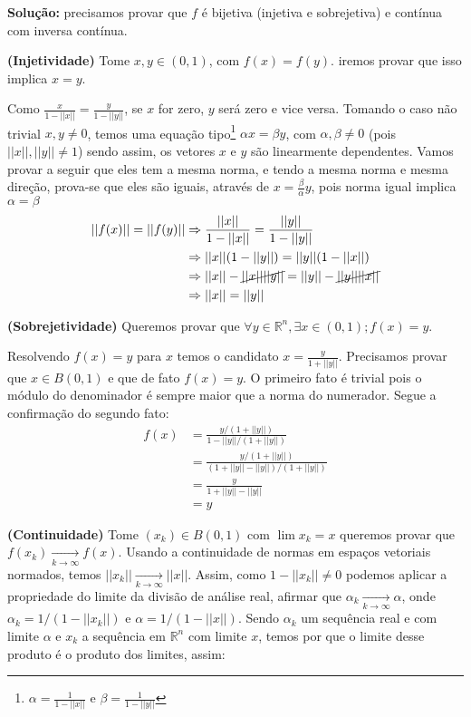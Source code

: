 \documentclass[12pt]{article}
\newcommand{\rn}{\mathbb{R}^n}
\begin{document}
\begin{enumerate}
\textbf{Solução:} precisamos provar que $f$ é bijetiva (injetiva e sobrejetiva) e contínua com inversa contínua.

\textbf{(Injetividade)} Tome $x,y\in(0,1)$, com $f(x)=f(y)$. iremos provar que isso implica $x=y$.

Como $\frac{x}{1 - ||x||}=\frac{y}{1 - ||y||}$, se $x$ for zero, $y$ será zero e vice versa. Tomando o caso não trivial $x,y\neq0$, temos uma equação tipo\footnote{$\alpha=\frac{1}{1 - ||x||}$ e $\beta=\frac{1}{1 - ||y||}$} $\alpha x=\beta y$, com $\alpha,\beta\neq0$ (pois $||x||,||y||\neq1$) sendo assim, os vetores $x$ e $y$ são linearmente dependentes. Vamos provar a seguir que eles tem a mesma norma, e tendo a mesma norma e mesma direção, prova-se que eles são iguais, através de $x=\frac\beta\alpha y$, pois norma igual implica $\alpha=\beta$
\begin{align}
	||f(x)||=||f(y)||&\Rightarrow \frac{||x||}{1 - ||x||}=\frac{||y||}{1 - ||y||}\nonumber\\
	&\Rightarrow ||x||(1-||y||)=||y||(1-||x||)\nonumber\\
	&\Rightarrow ||x||-\cancel{||x||||y||}=||y||-\cancel{||y||||x||}\nonumber\\
	&\Rightarrow ||x||=||y||\nonumber
\end{align}

\textbf{(Sobrejetividade)} Queremos provar que $\forall y \in \rn,\exists x\in(0,1);f(x)=y$.

Resolvendo $f(x)=y$ para $x$ temos o candidato $x=\frac{y}{1+||y||}$. Precisamos provar que $x\in B(0,1)$ e que de fato $f(x)=y$. O primeiro fato é trivial pois o módulo do denominador é sempre maior que a norma do numerador. Segue a confirmação do segundo fato:
\begin{align*}
	f(x)&=\frac{y/(1+||y||)}{1-||y||/(1+||y||)}\\
	&=\frac{y/(1+||y||)}{(1+||y||-||y||)/(1+||y||)}\\
	&=\frac{y}{1+||y||-||y||}\\
	&=y
\end{align*}

\textbf{(Continuidade)} Tome $(x_k)\in B(0,1)$ com $\lim x_k=x$ queremos provar que $f(x_k)\xrightarrow[k\to\infty]{}f(x)$. Usando a continuidade de normas em espaços vetoriais normados, temos $||x_k||\xrightarrow[k\to\infty]{}||x||$. Assim, como $1-||x_k||\neq0$ podemos aplicar a propriedade do limite da divisão de análise real\cite{lima1981curso}, afirmar que $\alpha_k\xrightarrow[k\to\infty]{}\alpha$, onde $\alpha_k=1/(1-||x_k||)$ e $\alpha=1/(1-||x||)$.
Sendo $\alpha_k$ um sequência real e com limite $\alpha$ e $x_k$ a sequência em $\rn$ com limite $x$, temos por \cite{analise2} que o limite desse produto é o produto dos limites, assim:


\end{enumerate}
\end{document}
